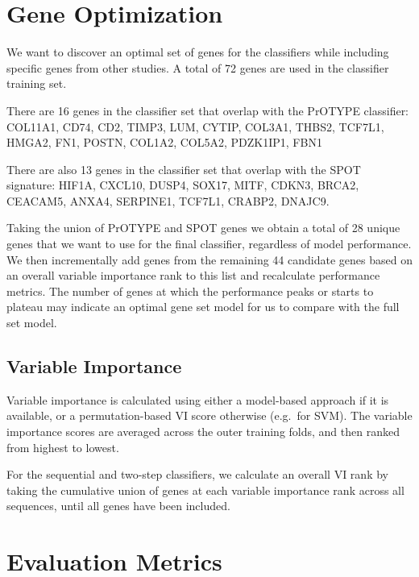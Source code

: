 \documentclass[
]{report}
\begin{document}
\hypertarget{gene-optimization}{%
\section{Gene Optimization}\label{gene-optimization}}

We want to discover an optimal set of genes for the classifiers while including specific genes from other studies. A total of 72 genes are used in the classifier training set.

There are 16 genes in the classifier set that overlap with the PrOTYPE classifier: COL11A1, CD74, CD2, TIMP3, LUM, CYTIP, COL3A1, THBS2, TCF7L1, HMGA2, FN1, POSTN, COL1A2, COL5A2, PDZK1IP1, FBN1

There are also 13 genes in the classifier set that overlap with the SPOT signature: HIF1A, CXCL10, DUSP4, SOX17, MITF, CDKN3, BRCA2, CEACAM5, ANXA4, SERPINE1, TCF7L1, CRABP2, DNAJC9.

Taking the union of PrOTYPE and SPOT genes we obtain a total of 28 unique genes that we want to use for the final classifier, regardless of model performance. We then incrementally add genes from the remaining 44 candidate genes based on an overall variable importance rank to this list and recalculate performance metrics. The number of genes at which the performance peaks or starts to plateau may indicate an optimal gene set model for us to compare with the full set model.

\hypertarget{variable-importance}{%
\subsection{Variable Importance}\label{variable-importance}}

Variable importance is calculated using either a model-based approach if it is available, or a permutation-based VI score otherwise (e.g.~for SVM). The variable importance scores are averaged across the outer training folds, and then ranked from highest to lowest.

For the sequential and two-step classifiers, we calculate an overall VI rank by taking the cumulative union of genes at each variable importance rank across all sequences, until all genes have been included.

\hypertarget{evaluation-metrics}{%
\section{Evaluation Metrics}\label{evaluation-metrics}}
\end{document}
